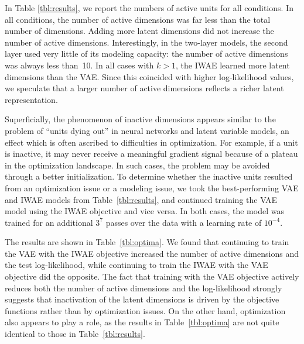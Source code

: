 \documentclass{article} %
\newcommand{\numSamples}{k}
\begin{document}
In Table \ref{tbl:results}, we report the numbers of active units for all conditions. In all conditions, the number of active dimensions was far less than the total number of dimensions. Adding more latent dimensions did not increase the number of active dimensions. Interestingly, in the two-layer models, the second layer used very little of its modeling capacity: the number of active dimensions was always less than~10. In all cases with $\numSamples > 1$, the IWAE learned more latent dimensions than the VAE. Since this coincided with higher log-likelihood values, we speculate that a larger number of active dimensions reflects a richer latent representation.




Superficially, the phenomenon of inactive dimensions appears similar to the problem of ``units dying out'' in neural networks and latent variable models, an effect which is often ascribed to difficulties in optimization. For example, if a unit is inactive, it may never receive a meaningful gradient signal because of a plateau in the optimization landscape. In such cases, the problem may be avoided through a better initialization. To determine whether the inactive units resulted from an optimization issue or a modeling issue, we took the best-performing VAE and IWAE models from Table~\ref{tbl:results}, and continued training the VAE model using the IWAE objective and vice versa. In both cases, the model was trained for an additional $3^7$ passes over the data with a learning rate of $10^{-4}$.

The results are shown in Table~\ref{tbl:optima}. We found that continuing to train the VAE with the IWAE objective increased the number of active dimensions and the test log-likelihood, while continuing to train the IWAE with the VAE objective did the opposite. The fact that training with the VAE objective actively reduces both the number of active dimensions and the log-likelihood strongly suggests that inactivation of the latent dimensions is driven by the objective functions rather than by optimization issues. On the other hand, optimization also appears to play a role, as the results in Table~\ref{tbl:optima} are not quite identical to those in Table~\ref{tbl:results}.
\end{document}
